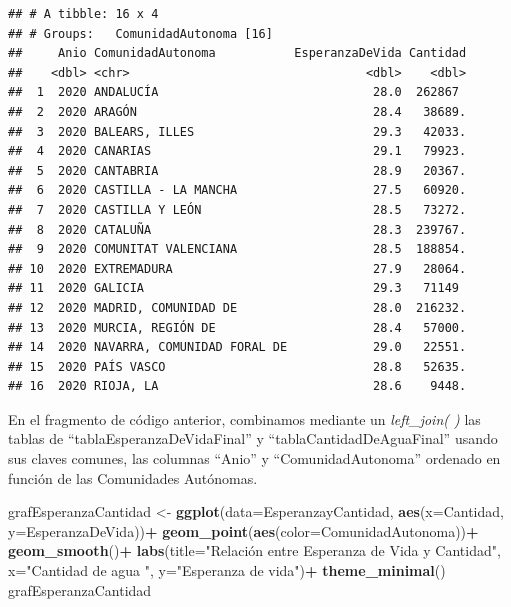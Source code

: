 \documentclass[
]{article}
\newenvironment{Shaded}{\begin{snugshade}}{\end{snugshade}}
\newcommand{\AttributeTok}[1]{\textcolor[rgb]{0.13,0.29,0.53}{#1}}
\newcommand{\FunctionTok}[1]{\textcolor[rgb]{0.13,0.29,0.53}{\textbf{#1}}}
\newcommand{\NormalTok}[1]{#1}
\newcommand{\OtherTok}[1]{\textcolor[rgb]{0.56,0.35,0.01}{#1}}
\newcommand{\SpecialCharTok}[1]{\textcolor[rgb]{0.81,0.36,0.00}{\textbf{#1}}}
\newcommand{\StringTok}[1]{\textcolor[rgb]{0.31,0.60,0.02}{#1}}
\begin{document}
\begin{verbatim}
## # A tibble: 16 x 4
## # Groups:   ComunidadAutonoma [16]
##     Anio ComunidadAutonoma           EsperanzaDeVida Cantidad
##    <dbl> <chr>                                 <dbl>    <dbl>
##  1  2020 ANDALUCÍA                              28.0  262867 
##  2  2020 ARAGÓN                                 28.4   38689.
##  3  2020 BALEARS, ILLES                         29.3   42033.
##  4  2020 CANARIAS                               29.1   79923.
##  5  2020 CANTABRIA                              28.9   20367.
##  6  2020 CASTILLA - LA MANCHA                   27.5   60920.
##  7  2020 CASTILLA Y LEÓN                        28.5   73272.
##  8  2020 CATALUÑA                               28.3  239767.
##  9  2020 COMUNITAT VALENCIANA                   28.5  188854.
## 10  2020 EXTREMADURA                            27.9   28064.
## 11  2020 GALICIA                                29.3   71149 
## 12  2020 MADRID, COMUNIDAD DE                   28.0  216232.
## 13  2020 MURCIA, REGIÓN DE                      28.4   57000.
## 14  2020 NAVARRA, COMUNIDAD FORAL DE            29.0   22551.
## 15  2020 PAÍS VASCO                             28.8   52635.
## 16  2020 RIOJA, LA                              28.6    9448.
\end{verbatim}

En el fragmento de código anterior, combinamos mediante un
\emph{left\_join( )} las tablas de ``tablaEsperanzaDeVidaFinal'' y
``tablaCantidadDeAguaFinal'' usando sus claves comunes, las columnas
``Anio'' y ``ComunidadAutonoma'' ordenado en función de las Comunidades
Autónomas.

\begin{Shaded}
\begin{Highlighting}[]
\NormalTok{grafEsperanzaCantidad }\OtherTok{\textless{}{-}} \FunctionTok{ggplot}\NormalTok{(}\AttributeTok{data=}\NormalTok{EsperanzayCantidad, }\FunctionTok{aes}\NormalTok{(}\AttributeTok{x=}\NormalTok{Cantidad, }\AttributeTok{y=}\NormalTok{EsperanzaDeVida))}\SpecialCharTok{+}
  \FunctionTok{geom\_point}\NormalTok{(}\FunctionTok{aes}\NormalTok{(}\AttributeTok{color=}\NormalTok{ComunidadAutonoma))}\SpecialCharTok{+}
  \FunctionTok{geom\_smooth}\NormalTok{()}\SpecialCharTok{+}
  \FunctionTok{labs}\NormalTok{(}\AttributeTok{title=}\StringTok{"Relación entre Esperanza de Vida y Cantidad"}\NormalTok{,}
       \AttributeTok{x=}\StringTok{"Cantidad de agua "}\NormalTok{,}
       \AttributeTok{y=}\StringTok{"Esperanza de vida"}\NormalTok{)}\SpecialCharTok{+}
  \FunctionTok{theme\_minimal}\NormalTok{()}
\NormalTok{grafEsperanzaCantidad}
\end{Highlighting}
\end{Shaded}
\end{document}
